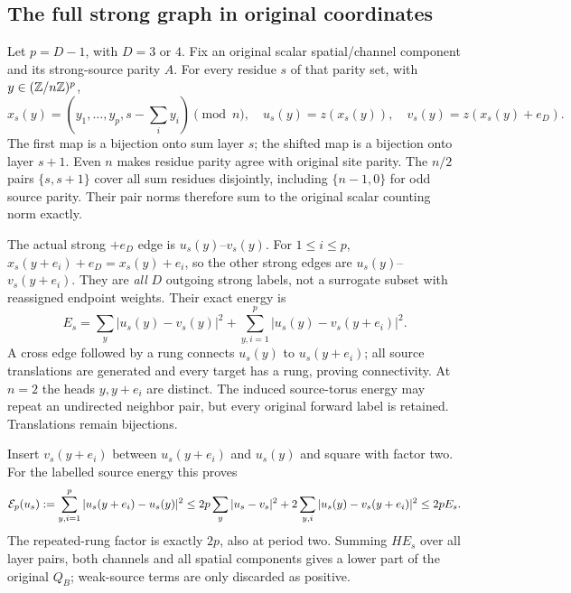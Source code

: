 \subsection{The full strong graph in original coordinates}
Let $p=D-1$, with $D=3$ or $4$. Fix an original scalar spatial/channel
component and its strong-source parity $A$. For every residue $s$ of that
parity set, with $y\in(\mathbb Z/n\mathbb Z)^p$,
\begin{equation}\label{eq:paircoordinates}
 x_s(y)=(y_1,\ldots,y_p,s-\textstyle\sum_i y_i)\pmod n,
 \quad u_s(y)=z(x_s(y)),\quad v_s(y)=z(x_s(y)+e_D).
\end{equation}
The first map is a bijection onto sum layer $s$; the shifted map is a
bijection onto layer $s+1$. Even $n$ makes residue parity agree with original
site parity. The $n/2$ pairs $\{s,s+1\}$ cover all sum residues disjointly,
including $\{n-1,0\}$ for odd source parity. Their pair norms therefore sum
to the original scalar counting norm exactly.

The actual strong $+e_D$ edge is $u_s(y)$--$v_s(y)$. For $1\leq i\leq p$,
$x_s(y+e_i)+e_D=x_s(y)+e_i$, so the other strong edges are
$u_s(y)$--$v_s(y+e_i)$. They are \emph{all} $D$ outgoing strong labels,
not a surrogate subset with reassigned endpoint weights. Their exact energy is
\begin{equation}\label{eq:pairenergy}
 E_s=\sum_y|u_s(y)-v_s(y)|^2+
          \sum_{y,i=1}^p|u_s(y)-v_s(y+e_i)|^2.
\end{equation}
A cross edge followed by a rung connects $u_s(y)$ to $u_s(y+e_i)$; all source
translations are generated and every target has a rung, proving connectivity.
At $n=2$ the heads $y,y+e_i$ are distinct. The induced source-torus energy
may repeat an undirected neighbor pair, but every original forward label is
retained. Translations remain bijections.

Insert $v_s(y+e_i)$ between $u_s(y+e_i)$ and $u_s(y)$ and square with factor
two. For the labelled source energy this proves
\begin{equation}\label{eq:graphcomparison}
 \mathcal E_p(u_s):=\sum_{y,i=1}^p|u_s(y+e_i)-u_s(y)|^2
 \leq2p\sum_y|u_s-v_s|^2+2\sum_{y,i}|u_s(y)-v_s(y+e_i)|^2
 \leq2pE_s.
\end{equation}
The repeated-rung factor is exactly $2p$, also at period two. Summing $HE_s$
over all layer pairs, both channels and all spatial components gives a lower
part of the original $Q_B$; weak-source terms are only discarded as positive.

